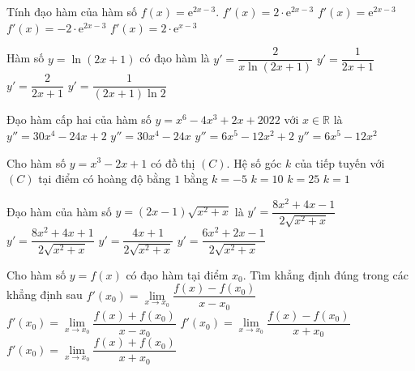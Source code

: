 \begin{ex}%
	Tính đạo hàm của hàm số $f(x)=\mathrm{e}^{2x-3}$. 
	\choice
	{\True $f'(x)=2\cdot\mathrm{e}^{2x-3}$}
	{$f'(x)=\mathrm{e}^{2x-3}$}
	{$f'(x)=-2\cdot\mathrm{e}^{2x-3}$}
	{$f'(x)=2\cdot\mathrm{e}^{x-3}$}
\end{ex}
\begin{ex}%
	Hàm số $y=\ln(2x+1)$ có đạo hàm là
	\choice
	{$y'=\dfrac{2}{x\ln(2x+1)}$}
	{$y'=\dfrac{1}{2x+1}$}
	{\True $y'=\dfrac{2}{2x+1}$}
	{$y'=\dfrac{1}{(2x+1)\ln 2}$}
\end{ex}
\begin{ex}%
	Đạo hàm cấp hai của hàm số $y=x^6-4x^3+2x+2022$ với $x\in\mathbb{R}$ là
	\choice
	{$y''=30x^4-24x+2$}
	{\True $y''=30x^4-24x$}
	{$y''=6x^5-12x^2+2$}
	{$y''=6x^5-12x^2$}
\end{ex}
\begin{ex}%
	Cho hàm số $y=x^3-2x+1$ có đồ thị $(C)$. Hệ số góc $k$ của tiếp tuyến với $(C)$ tại điểm có hoàng độ bằng $1$ bằng
	\choice
	{$k=-5$}
	{$k=10$}
	{$k=25$}
	{\True $k=1$}
\end{ex}
\begin{ex}%
	Đạo hàm của hàm số $y=(2x-1)\sqrt{x^2+x}$ là
	\choice
	{\True $y'=\dfrac{8x^2+4x-1}{2\sqrt{x^2+x}}$}
	{$y'=\dfrac{8x^2+4x+1}{2\sqrt{x^2+x}}$}
	{$y'=\dfrac{4x+1}{2\sqrt{x^2+x}}$}
	{$y'=\dfrac{6x^2+2x-1}{2\sqrt{x^2+x}}$}
\end{ex}
\begin{ex}%
	Cho hàm số $y=f(x)$ có đạo hàm tại điểm $x_0$. Tìm khẳng định đúng trong các khẳng định sau
	\choice
	{\True $f'(x_0)=\lim\limits_{x\to x_0}\dfrac{f(x)-f(x_0)}{x-x_0}$}
	{$f'(x_0)=\lim\limits_{x\to x_0}\dfrac{f(x)+f(x_0)}{x-x_0}$}
	{$f'(x_0)=\lim\limits_{x\to x_0}\dfrac{f(x)-f(x_0)}{x+x_0}$}
	{$f'(x_0)=\lim\limits_{x\to x_0}\dfrac{f(x)+f(x_0)}{x+x_0}$}
\end{ex}

